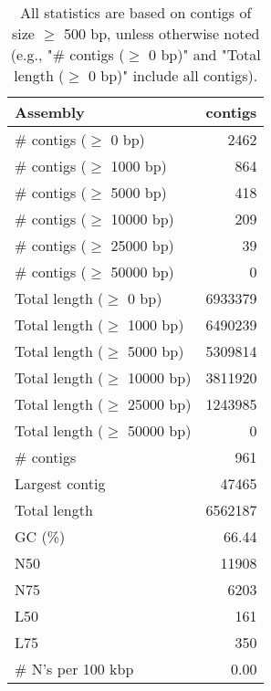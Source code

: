 \documentclass[12pt,a4paper]{article}
\begin{document}
\begin{table}[ht]
\begin{center}
\caption{All statistics are based on contigs of size $\geq$ 500 bp, unless otherwise noted (e.g., "\# contigs ($\geq$ 0 bp)" and "Total length ($\geq$ 0 bp)" include all contigs).}
\begin{tabular}{|l*{1}{|r}|}
\hline
Assembly & contigs \\ \hline
\# contigs ($\geq$ 0 bp) & 2462 \\ \hline
\# contigs ($\geq$ 1000 bp) & 864 \\ \hline
\# contigs ($\geq$ 5000 bp) & 418 \\ \hline
\# contigs ($\geq$ 10000 bp) & 209 \\ \hline
\# contigs ($\geq$ 25000 bp) & 39 \\ \hline
\# contigs ($\geq$ 50000 bp) & 0 \\ \hline
Total length ($\geq$ 0 bp) & 6933379 \\ \hline
Total length ($\geq$ 1000 bp) & 6490239 \\ \hline
Total length ($\geq$ 5000 bp) & 5309814 \\ \hline
Total length ($\geq$ 10000 bp) & 3811920 \\ \hline
Total length ($\geq$ 25000 bp) & 1243985 \\ \hline
Total length ($\geq$ 50000 bp) & 0 \\ \hline
\# contigs & 961 \\ \hline
Largest contig & 47465 \\ \hline
Total length & 6562187 \\ \hline
GC (\%) & 66.44 \\ \hline
N50 & 11908 \\ \hline
N75 & 6203 \\ \hline
L50 & 161 \\ \hline
L75 & 350 \\ \hline
\# N's per 100 kbp & 0.00 \\ \hline
\end{tabular}
\end{center}
\end{table}
\end{document}
